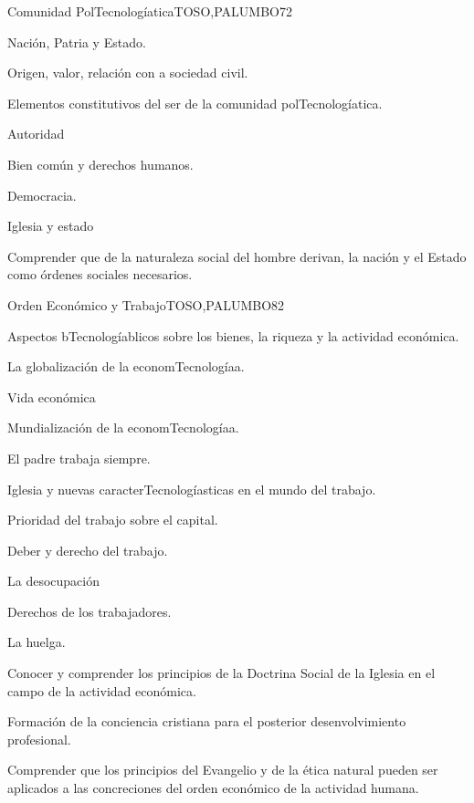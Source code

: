 \begin{syllabus}
\begin{unit}{Comunidad PolTecnologíatica}{TOSO,PALUMBO}{7}{2}
\begin{topics}
	\item Nación, Patria y Estado.
	\item Origen, valor, relación con a sociedad civil.
	\item Elementos constitutivos del ser de la comunidad polTecnologíatica.
	\item Autoridad
	\item Bien común y derechos humanos.
	\item Democracia.
	\item Iglesia y estado
\end{topics}
\begin{unitgoals}
	\item Comprender que de la naturaleza social del hombre derivan, la nación y el Estado como órdenes sociales necesarios.
\end{unitgoals}
\end{unit}

\begin{unit}{Orden Económico y Trabajo}{TOSO,PALUMBO}{8}{2}
\begin{topics}
	\item Aspectos bTecnologíablicos sobre los bienes, la riqueza y la actividad económica.
	\item La globalización de la economTecnologíaa.
	\item Vida económica
	\item Mundialización de la economTecnologíaa.
	\item El padre trabaja siempre.
	\item Iglesia y nuevas caracterTecnologíasticas en el mundo del trabajo.
	\item Prioridad del trabajo sobre el capital.
	\item Deber y derecho del trabajo.
	\item La desocupación
	\item Derechos de los trabajadores.
	\item La huelga.
\end{topics}
\begin{unitgoals}
	\item Conocer y comprender los principios de la Doctrina Social de la Iglesia en el campo de la actividad económica.
	\item Formación de la conciencia cristiana para el posterior desenvolvimiento profesional.
	\item Comprender que los principios del Evangelio y de la ética natural pueden ser aplicados a las concreciones del orden económico de la actividad humana.
\end{unitgoals}
\end{unit}



\begin{coursebibliography}
\end{coursebibliography}

\end{syllabus}

